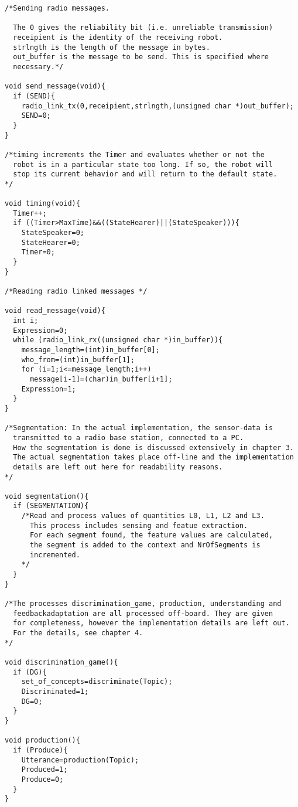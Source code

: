 {\begin{verbatim}
/*Sending radio messages.

  The 0 gives the reliability bit (i.e. unreliable transmission)
  receipient is the identity of the receiving robot.
  strlngth is the length of the message in bytes.
  out_buffer is the message to be send. This is specified where
  necessary.*/

void send_message(void){
  if (SEND){
    radio_link_tx(0,receipient,strlngth,(unsigned char *)out_buffer);
    SEND=0;
  }
}

/*timing increments the Timer and evaluates whether or not the
  robot is in a particular state too long. If so, the robot will
  stop its current behavior and will return to the default state.
*/

void timing(void){
  Timer++;
  if ((Timer>MaxTime)&&((StateHearer)||(StateSpeaker))){
    StateSpeaker=0;
    StateHearer=0;
    Timer=0;
  }
}

/*Reading radio linked messages */

void read_message(void){
  int i;
  Expression=0;
  while (radio_link_rx((unsigned char *)in_buffer)){
    message_length=(int)in_buffer[0];
    who_from=(int)in_buffer[1];
    for (i=1;i<=message_length;i++)
      message[i-1]=(char)in_buffer[i+1];
    Expression=1;
  }
}

/*Segmentation: In the actual implementation, the sensor-data is
  transmitted to a radio base station, connected to a PC. 
  How the segmentation is done is discussed extensively in chapter 3.
  The actual segmentation takes place off-line and the implementation 
  details are left out here for readability reasons.
*/

void segmentation(){
  if (SEGMENTATION){
    /*Read and process values of quantities L0, L1, L2 and L3.
      This process includes sensing and featue extraction.
      For each segment found, the feature values are calculated,
      the segment is added to the context and NrOfSegments is 
      incremented.
    */
  }
}

/*The processes discrimination_game, production, understanding and
  feedbackadaptation are all processed off-board. They are given 
  for completeness, however the implementation details are left out. 
  For the details, see chapter 4.
*/

void discrimination_game(){
  if (DG){
    set_of_concepts=discriminate(Topic);
    Discriminated=1;
    DG=0;
  }
}

void production(){
  if (Produce){
    Utterance=production(Topic);
    Produced=1;
    Produce=0;
  }
}


\end{verbatim}}
